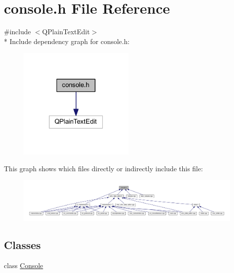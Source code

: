 \hypertarget{a00033}{\section{console.\+h File Reference}
\label{a00033}
}
{\ttfamily \#include $<$Q\+Plain\+Text\+Edit$>$}\\*
Include dependency graph for console.\+h\+:
\nopagebreak
\begin{figure}[H]
\begin{center}
\leavevmode
\includegraphics[width=162pt]{db/d48/a00148}
\end{center}
\end{figure}
This graph shows which files directly or indirectly include this file\+:
\nopagebreak
\begin{figure}[H]
\begin{center}
\leavevmode
\includegraphics[width=350pt]{da/d1e/a00149}
\end{center}
\end{figure}
\subsection*{Classes}
\begin{DoxyCompactItemize}
\item 
class \hyperlink{a00002}{Console}
\end{DoxyCompactItemize}
